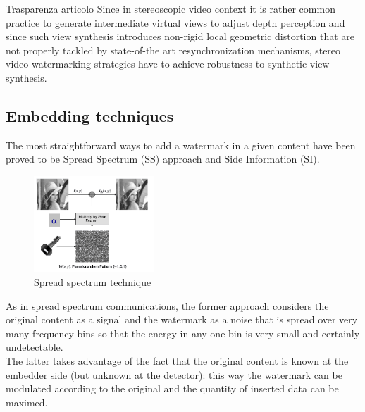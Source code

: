 Trasparenza articolo
\newline
Since in stereoscopic video context it is rather common practice to generate intermediate virtual views to adjust depth perception and since such view synthesis introduces non-rigid local geometric distortion that are not properly tackled by state-of-the art resynchronization mechanisms, stereo video watermarking strategies have to achieve robustness to synthetic view synthesis.


\subsection{Embedding techniques}
The most straightforward ways to add a watermark in a given content have been proved to be Spread Spectrum (SS) approach and Side Information (SI).\\
\begin{figure}[h!]
\centering
\includegraphics[width=0.4\textwidth]{./img/ss.png}
\caption{\small{Spread spectrum technique}}
\label{fig:ss}
\end{figure}
As in spread spectrum communications, the former approach considers the original
content as a signal and the watermark as a noise that is spread over very many frequency bins so that the energy in any one bin is very small and certainly undetectable.\\
The latter takes advantage of the fact that the original content is known at the
embedder side (but unknown at the detector): this way the watermark can be modulated  according to the original and the quantity of
inserted data can be maximed.\\

